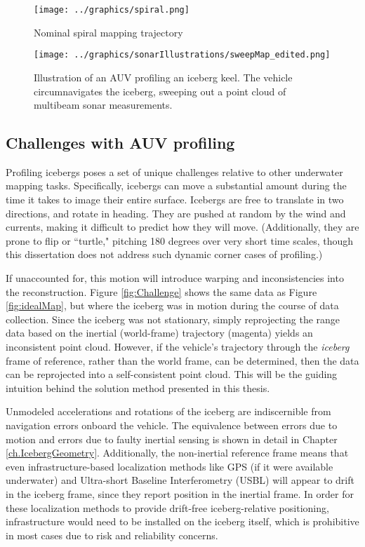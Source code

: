 \begin{figure}[htb]
   \centering
   \texttt{[image: ../graphics/spiral.png]} %
   \caption{Nominal spiral mapping trajectory }
   \label{fig:NominalProfile1}
\end{figure}

\begin{figure}[!htb]
   \centering
   \texttt{[image: ../graphics/sonarIllustrations/sweepMap\_edited.png]} %
   \caption{Illustration of an AUV profiling an iceberg keel. The vehicle circumnavigates the iceberg, sweeping out a point cloud of multibeam sonar measurements. }
   \label{fig:introSetup}
\end{figure}

\subsection{Challenges with AUV profiling}

Profiling icebergs poses a set of unique challenges relative to other underwater mapping tasks. Specifically, icebergs can move a substantial amount during the time it takes to image their entire surface. Icebergs are free to translate in two directions, and rotate in heading. They are pushed at random by the wind  and currents, making it difficult to predict how they will move. (Additionally, they are prone to flip or ``turtle," pitching 180 degrees over very short time scales, though this dissertation does not address such dynamic corner cases of profiling.) 

If unaccounted for, this motion will introduce warping and inconsistencies into the reconstruction. Figure \ref{fig:Challenge} shows the same data as Figure \ref{fig:idealMap}, but where the iceberg was in motion during the course of data collection. Since the iceberg was not stationary, simply reprojecting the range data based on the inertial (world-frame) trajectory (magenta) yields an inconsistent point cloud. However, if the vehicle's trajectory through the \emph{iceberg} frame of reference, rather than the world frame, can be determined, then the data can be reprojected into a self-consistent point cloud. This will be the guiding intuition behind the solution method presented in this thesis.

Unmodeled accelerations and rotations of the iceberg are indiscernible from navigation errors onboard the vehicle. The equivalence between errors due to motion and errors due to faulty inertial sensing is shown in detail in Chapter \ref{ch.IcebergGeometry}. Additionally, the non-inertial reference frame means that even infrastructure-based localization methods like GPS (if it were available underwater) and Ultra-short Baseline Interferometry (USBL) will appear to drift in the iceberg frame, since they report position in the inertial frame. In order for these localization methods to provide drift-free iceberg-relative positioning, infrastructure would need to be installed on the iceberg itself, which is prohibitive in most cases due to risk and reliability concerns.

